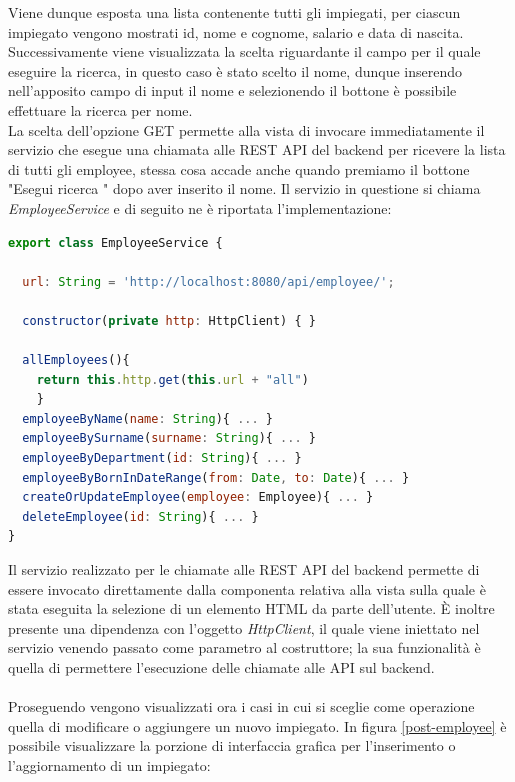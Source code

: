 \FloatBarrier
Viene dunque esposta una lista contenente tutti gli impiegati, per ciascun impiegato vengono mostrati id, nome e cognome, salario e data di nascita. Successivamente viene visualizzata la scelta riguardante il campo per il quale eseguire la ricerca, in questo caso è stato scelto il nome, dunque inserendo nell'apposito campo di input il nome e selezionendo il bottone è possibile effettuare la ricerca per nome.\\
La scelta dell'opzione GET permette alla vista di invocare immediatamente il servizio che esegue una chiamata alle REST API del backend per ricevere la lista di tutti gli employee, stessa cosa accade anche quando premiamo il bottone "Esegui ricerca " dopo aver inserito il nome. Il servizio in questione si chiama \textit{EmployeeService} e di seguito ne è riportata l'implementazione:
\begin{lstlisting}[language=JavaScript, title={employee.service.ts}]
export class EmployeeService {

  url: String = 'http://localhost:8080/api/employee/';

  constructor(private http: HttpClient) { }

  allEmployees(){
    return this.http.get(this.url + "all")
    }
  employeeByName(name: String){ ... }
  employeeBySurname(surname: String){ ... }
  employeeByDepartment(id: String){ ... }
  employeeByBornInDateRange(from: Date, to: Date){ ... }
  createOrUpdateEmployee(employee: Employee){ ... }
  deleteEmployee(id: String){ ... }
}
\end{lstlisting}
Il servizio realizzato per le chiamate alle REST API del backend permette di essere invocato direttamente dalla componenta relativa alla vista sulla quale è stata eseguita la selezione di un elemento HTML da parte dell'utente. È inoltre presente una dipendenza con l'oggetto \textit{HttpClient}, il quale viene iniettato nel servizio venendo passato come parametro al costruttore; la sua funzionalità è quella di permettere l'esecuzione delle chiamate alle API sul backend.\\\\
Proseguendo vengono visualizzati ora i casi in cui si sceglie come operazione quella di modificare o aggiungere un nuovo impiegato. In figura \ref{post-employee} è possibile visualizzare la porzione di interfaccia grafica per l'inserimento o l'aggiornamento di un impiegato:
